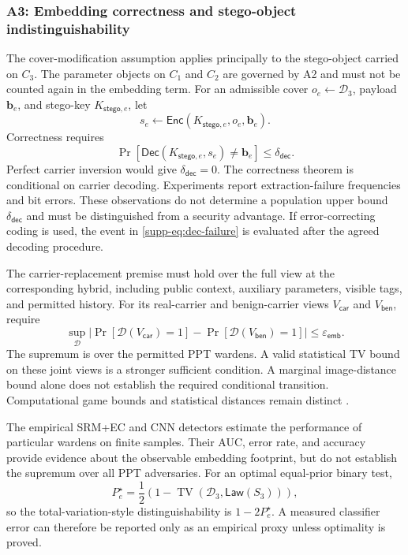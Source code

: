 \documentclass[journal]{IEEEtran}
\theoremstyle{definition}
\theoremstyle{game}
\begin{document}
\subsubsection{A3: Embedding correctness and stego-object indistinguishability}
\label{supp-assump:a3}

The cover-modification assumption applies principally to the
stego-object carried on $C_3$. The parameter objects on $C_1$ and
$C_2$ are governed by A2 and must not be counted again in the
embedding term. For an admissible cover
$o_e\leftarrow\mathcal D_3$, payload $\mathbf b_e$, and stego-key
$K_{\mathsf{stego},e}$, let
\[
s_e
\leftarrow
\mathsf{Enc}(K_{\mathsf{stego},e},o_e,\mathbf b_e).
\]
Correctness requires
\begin{equation}
\Pr\!\left[
 \mathsf{Dec}(K_{\mathsf{stego},e},s_e)
 \neq \mathbf b_e
\right]
\leq \delta_{\mathsf{dec}}.
\label{supp-eq:dec-failure}
\end{equation}
Perfect carrier inversion would give $\delta_{\mathsf{dec}}=0$.
The correctness theorem is conditional on carrier decoding.
Experiments report extraction-failure frequencies and bit errors.
These observations do not determine a population upper bound
$\delta_{\mathsf{dec}}$ and must be distinguished from a security advantage.
If error-correcting coding is used, the event in
\eqref{supp-eq:dec-failure} is evaluated after the agreed decoding
procedure.

The carrier-replacement premise must hold over the full view at the
corresponding hybrid, including public context, auxiliary parameters,
visible tags, and permitted history. For its real-carrier and benign-carrier
views $V_{\mathsf{car}}$ and $V_{\mathsf{ben}}$, require
\begin{equation}\label{supp-eq:embedding-gap}
\sup_{\mathcal D}\left|\Pr[\mathcal D(V_{\mathsf{car}})=1]
-\Pr[\mathcal D(V_{\mathsf{ben}})=1]\right|
\le\varepsilon_{\mathsf{emb}}.
\end{equation}
The supremum is over the permitted PPT wardens. A valid statistical TV
bound on these joint views is a stronger sufficient condition. A marginal
image-distance bound alone does not establish the required conditional
transition. Computational game bounds and statistical distances remain
distinct \cite{@Hopper2002,@hopper2009provably,vonahn2003publickey}.

The empirical SRM+EC and CNN detectors estimate the performance
of particular wardens on finite samples. Their AUC, error rate,
and accuracy provide evidence about the observable embedding
footprint, but do not establish the supremum over all PPT
adversaries. For an optimal equal-prior binary test,
\[
P_e^{\star}
=\frac12\left(1-
\operatorname{TV}(\mathcal D_3,\mathsf{Law}(S_3))
\right),
\]
so the total-variation-style distinguishability is
$1-2P_e^{\star}$. A measured classifier error can therefore be
reported only as an empirical proxy unless optimality is proved.
\end{document}
